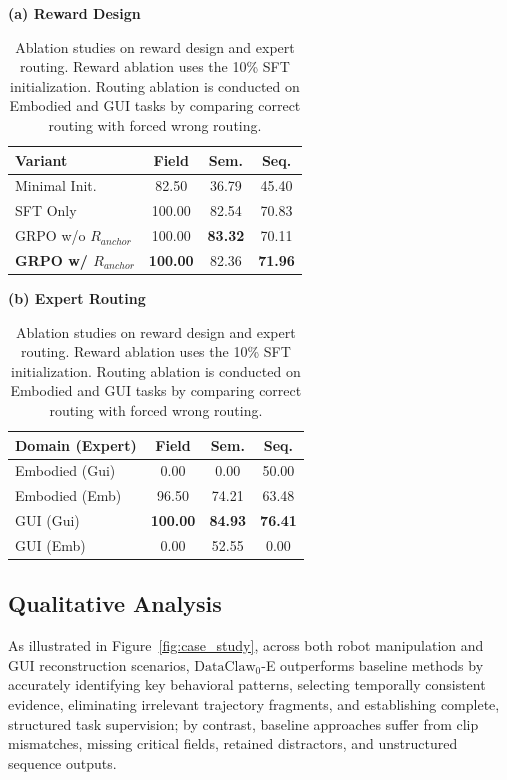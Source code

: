 \begin{table}[t]
\centering
\caption{Ablation studies on reward design and expert routing. Reward ablation uses the 10\% SFT initialization. Routing ablation is conducted on Embodied and GUI tasks by comparing correct routing with forced wrong routing.}
\label{tab:ablation}
\small

\begin{minipage}{0.48\textwidth}
\centering
\textbf{(a) Reward Design}\\[2mm]
\begin{tabular}{lccc}
\toprule
\textbf{Variant} & \textbf{Field} & \textbf{Sem.} & \textbf{Seq.} \\
\midrule
Minimal Init. & 82.50 & 36.79 & 45.40 \\
SFT Only & 100.00 & 82.54 & 70.83 \\
GRPO w/o \(R_{anchor}\) & 100.00 & \textbf{83.32} & 70.11 \\
\textbf{GRPO w/ \(R_{anchor}\)} & \textbf{100.00} & 82.36 & \textbf{71.96} \\
\bottomrule
\end{tabular}
\end{minipage}
\hfill
\begin{minipage}{0.48\textwidth}
\centering
\textbf{(b) Expert Routing}\\[2mm]
\begin{tabular}{lccc}
\toprule
\textbf{Domain (Expert)} & \textbf{Field} & \textbf{Sem.} & \textbf{Seq.} \\
\midrule
Embodied (Gui) & 0.00 & 0.00 & 50.00 \\
Embodied (Emb) & 96.50 & 74.21 & 63.48 \\
GUI (Gui) & \textbf{100.00} & \textbf{84.93} & \textbf{76.41} \\
GUI (Emb) & 0.00 & 52.55 & 0.00 \\
\bottomrule
\end{tabular}
\end{minipage}

\end{table}



\subsection{Qualitative Analysis}
As illustrated in Figure~\ref{fig:case_study}, across both robot manipulation and GUI reconstruction scenarios, $\text{DataClaw}_0$-E outperforms baseline methods by accurately identifying key behavioral patterns, selecting temporally consistent evidence, eliminating irrelevant trajectory fragments, and establishing complete, structured task supervision; by contrast, baseline approaches suffer from clip mismatches, missing critical fields, retained distractors, and unstructured sequence outputs.      



